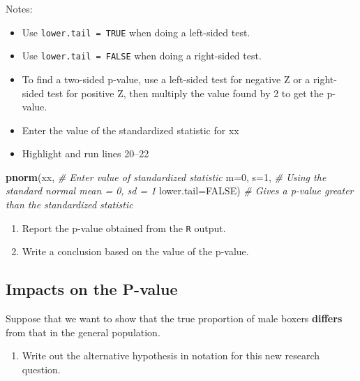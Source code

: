 \documentclass[
]{report}
\newenvironment{Shaded}{\begin{snugshade}}{\end{snugshade}}
\newcommand{\AttributeTok}[1]{\textcolor[rgb]{0.13,0.29,0.53}{#1}}
\newcommand{\CommentTok}[1]{\textcolor[rgb]{0.56,0.35,0.01}{\textit{#1}}}
\newcommand{\ConstantTok}[1]{\textcolor[rgb]{0.56,0.35,0.01}{#1}}
\newcommand{\DecValTok}[1]{\textcolor[rgb]{0.00,0.00,0.81}{#1}}
\newcommand{\FunctionTok}[1]{\textcolor[rgb]{0.13,0.29,0.53}{\textbf{#1}}}
\newcommand{\NormalTok}[1]{#1}
\providecommand{\tightlist}{%
  \setlength{\itemsep}{0pt}\setlength{\parskip}{0pt}}
\begin{document}
Notes:

\begin{itemize}
\item
  Use \texttt{lower.tail\ =\ TRUE} when doing a left-sided test.
\item
  Use \texttt{lower.tail\ =\ FALSE} when doing a right-sided test.
\item
  To find a two-sided p-value, use a left-sided test for negative Z or a right-sided test for positive Z, then multiply the value found by 2 to get the p-value.
\item
  Enter the value of the standardized statistic for xx
\item
  Highlight and run lines 20--22
\end{itemize}

\begin{Shaded}
\begin{Highlighting}[]
\FunctionTok{pnorm}\NormalTok{(xx, }\CommentTok{\# Enter value of standardized statistic}
      \AttributeTok{m=}\DecValTok{0}\NormalTok{, }\AttributeTok{s=}\DecValTok{1}\NormalTok{, }\CommentTok{\# Using the standard normal mean = 0, sd = 1}
      \AttributeTok{lower.tail=}\ConstantTok{FALSE}\NormalTok{) }\CommentTok{\# Gives a p{-}value greater than the standardized statistic}
\end{Highlighting}
\end{Shaded}

\begin{enumerate}
\def\labelenumi{\arabic{enumi}.}
\setcounter{enumi}{10}
\item
  Report the p-value obtained from the \texttt{R} output.
  \vspace{0.3in}
\item
  Write a conclusion based on the value of the p-value.
\end{enumerate}

\vspace{0.6in}

\subsection*{Impacts on the P-value}\label{impacts-on-the-p-value}

Suppose that we want to show that the true proportion of male boxers \textbf{differs} from that in the general population.

\begin{enumerate}
\def\labelenumi{\arabic{enumi}.}
\setcounter{enumi}{12}
\tightlist
\item
  Write out the alternative hypothesis in notation for this new research question.
\end{enumerate}
\end{document}
